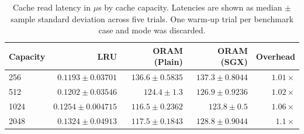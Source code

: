 \begin{table}[H]
\centering
\small
\setlength{\tabcolsep}{4pt}
\begin{tabular}{lrrrr}
\toprule
Capacity & LRU & ORAM (Plain) & ORAM (SGX) & Overhead \\
\midrule
256 & $0.1193 \pm 0.03701$ & $136.6 \pm 0.5835$ & $137.3 \pm 0.8044$ & $1.01\times$ \\
512 & $0.1202 \pm 0.03546$ & $124.4 \pm 1.3$ & $126.9 \pm 0.9236$ & $1.02\times$ \\
1024 & $0.1254 \pm 0.004715$ & $116.5 \pm 0.2362$ & $123.8 \pm 0.5$ & $1.06\times$ \\
2048 & $0.1324 \pm 0.04913$ & $117.5 \pm 0.1843$ & $128.8 \pm 0.9044$ & $1.1\times$ \\
\bottomrule
\end{tabular}
\caption{Cache read latency in ${}\mu$s by cache capacity. Latencies are shown as median $\pm$ sample standard deviation across five trials. One warm-up trial per benchmark case and mode was discarded.}
\label{tab:reproduction-table5}
\end{table}
